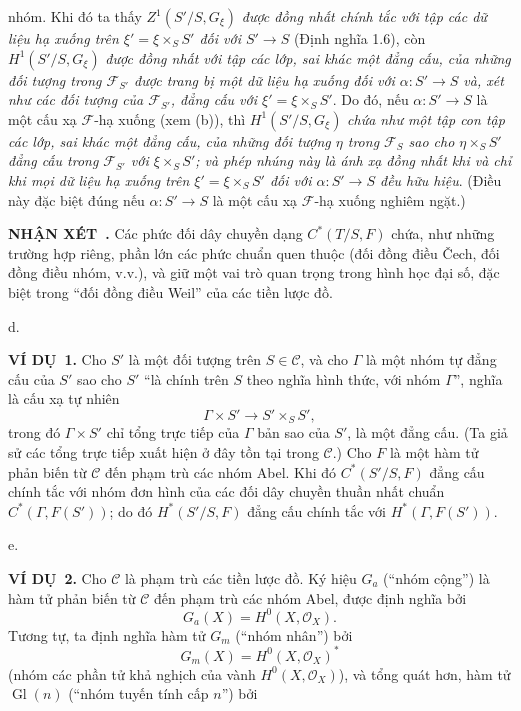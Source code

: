 \documentclass[11pt,twoside,openany]{book}
\numberwithin{equation}{section}
\newcommand{\src}[1]{%
  \phantomsection\hypertarget{src:\fgasourceid:#1}{}%
  \marginpar{\raggedleft\footnotesize\sffamily #1}%
}
\newcommand{\fgasourceid}{unset}
\newcommand{\result}[2]{\par\medskip\noindent\textbf{#1\if\relax\detokenize{#2}\relax\else\ #2\fi.}\quad}
\begin{document}
\src{312}
nhóm. Khi đó ta thấy $Z^1(S'/S,G_\xi)$ \emph{được đồng nhất chính tắc với tập
các dữ liệu hạ xuống trên $\xi'=\xi\times_SS'$ đối với
$S'\longrightarrow S$} (Định nghĩa 1.6), còn $H^1(S'/S,G_\xi)$ \emph{được
đồng nhất với tập các lớp, sai khác một đẳng cấu, của những đối tượng trong
$\mathcal F_{S'}$ được trang bị một dữ liệu hạ xuống đối với
$\alpha:S'\longrightarrow S$ và, xét như các đối tượng của
$\mathcal F_{S'}$, đẳng cấu với $\xi'=\xi\times_SS'$}. Do đó, nếu
$\alpha:S'\longrightarrow S$ là một cấu xạ $\mathcal F$-hạ xuống (xem (b)),
thì $H^1(S'/S,G_\xi)$ \emph{chứa như một tập con tập các lớp, sai khác một
đẳng cấu, của những đối tượng $\eta$ trong $\mathcal F_S$ sao cho
$\eta\times_SS'$ đẳng cấu trong $\mathcal F_{S'}$ với $\xi\times_SS'$; và phép
nhúng này là ánh xạ đồng nhất khi và chỉ khi mọi dữ liệu hạ xuống trên
$\xi'=\xi\times_SS'$ đối với $\alpha:S'\longrightarrow S$ đều hữu hiệu}.
(Điều này đặc biệt đúng nếu $\alpha:S'\longrightarrow S$ là một cấu xạ
$\mathcal F$-hạ xuống nghiêm ngặt.)

\result{NHẬN XÉT}{} Các phức đối dây chuyền dạng $C^*(T/S,F)$ chứa, như những
trường hợp riêng, phần lớn các phức chuẩn quen thuộc (đối đồng điều Čech, đối
đồng điều nhóm, v.v.), và giữ một vai trò quan trọng trong hình học đại số,
đặc biệt trong “đối đồng điều Weil” của các tiền lược đồ.

\medskip\noindent
d. \result{VÍ DỤ}{1} Cho $S'$ là một đối tượng trên $S\in\mathcal C$, và cho
$\Gamma$ là một nhóm tự đẳng cấu của $S'$ sao cho $S'$ “là chính trên $S$
theo nghĩa hình thức, với nhóm $\Gamma$”, nghĩa là cấu xạ tự nhiên
\[
  \Gamma\times S'\longrightarrow S'\times_SS',
\]
trong đó $\Gamma\times S'$ chỉ tổng trực tiếp của $\Gamma$ bản sao của $S'$,
là một đẳng cấu. (Ta giả sử các tổng trực tiếp xuất hiện
ở đây tồn tại trong $\mathcal C$.) Cho $F$ là một hàm tử phản biến từ
$\mathcal C$ đến phạm trù các nhóm Abel. Khi đó $C^*(S'/S,F)$ đẳng cấu chính
tắc với nhóm đơn hình của các đối dây chuyền thuần nhất chuẩn
$C^*(\Gamma,F(S'))$; do đó $H^*(S'/S,F)$ đẳng cấu chính tắc với
$H^*(\Gamma,F(S'))$.

\medskip\noindent
e. \result{VÍ DỤ}{2} Cho $\mathcal C$ là phạm trù các tiền lược đồ. Ký hiệu
$G_a$ (“nhóm cộng”) là hàm tử phản biến từ $\mathcal C$ đến phạm trù các
nhóm Abel, được định nghĩa bởi
\[
  G_a(X)=H^0(X,\mathcal O_X).
\]
Tương tự, ta định nghĩa hàm tử $G_m$ (“nhóm nhân”) bởi
\[
  G_m(X)=H^0(X,\mathcal O_X)^*
\]
(nhóm các phần tử khả nghịch của vành $H^0(X,\mathcal O_X)$), và tổng quát hơn,
hàm tử $\operatorname{Gl}(n)$ (“nhóm tuyến tính cấp $n$”) bởi
\end{document}

